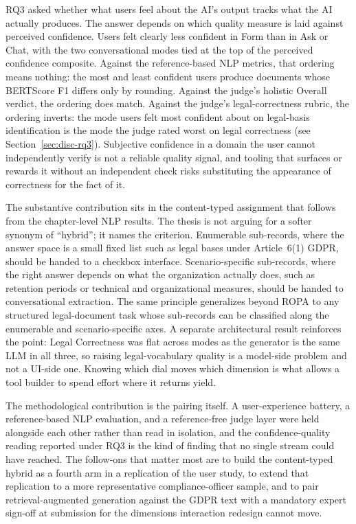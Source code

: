 RQ3 asked whether what users feel about the AI's output
tracks what the AI actually produces. The answer depends on
which quality measure is laid against perceived confidence.
Users felt clearly less confident in Form than in Ask or
Chat, with the two conversational modes tied at the top of
the perceived confidence composite. Against the
reference-based NLP metrics, that ordering means nothing: the
most and least confident users produce documents whose
BERTScore F1 differs only by rounding. Against the judge's
holistic Overall verdict, the ordering does match. Against
the judge's legal-correctness rubric, the ordering inverts:
the mode users felt most confident about on legal-basis
identification is the mode the judge rated worst on legal
correctness (see Section~\ref{sec:disc-rq3}). Subjective
confidence in a domain the user cannot independently verify
is not a reliable quality signal, and tooling that surfaces
or rewards it without an independent check risks substituting
the appearance of correctness for the fact of it.


The substantive contribution sits in the content-typed
assignment that follows from the chapter-level NLP results.
The thesis is not arguing for a softer synonym of
``hybrid''; it names the criterion. Enumerable sub-records,
where the answer space is a small fixed list such as legal
bases under Article~6(1) GDPR, should be handed to a
checkbox interface. Scenario-specific sub-records, where the
right answer depends on what the organization actually does,
such as retention periods or technical and organizational
measures, should be handed to conversational extraction. The
same principle generalizes beyond ROPA to any structured
legal-document task whose sub-records can be classified along
the enumerable and scenario-specific axes. A separate
architectural result reinforces the point: Legal Correctness
was flat across modes as the generator is the same LLM
in all three, so raising legal-vocabulary quality is a
model-side problem and not a UI-side one. Knowing which dial
moves which dimension is what allows a tool builder to spend
effort where it returns yield.

The methodological contribution is the pairing itself. A
user-experience battery, a reference-based NLP evaluation,
and a reference-free judge layer were held alongside each
other rather than read in isolation, and the
confidence-quality reading reported under RQ3 is the kind of
finding that no single stream could have reached. The
follow-ons that matter most are to build the content-typed
hybrid as a fourth arm in a replication of the user study, to
extend that replication to a more representative
compliance-officer sample, and to pair retrieval-augmented
generation against the GDPR text with a mandatory expert
sign-off at submission for the dimensions interaction
redesign cannot move.

